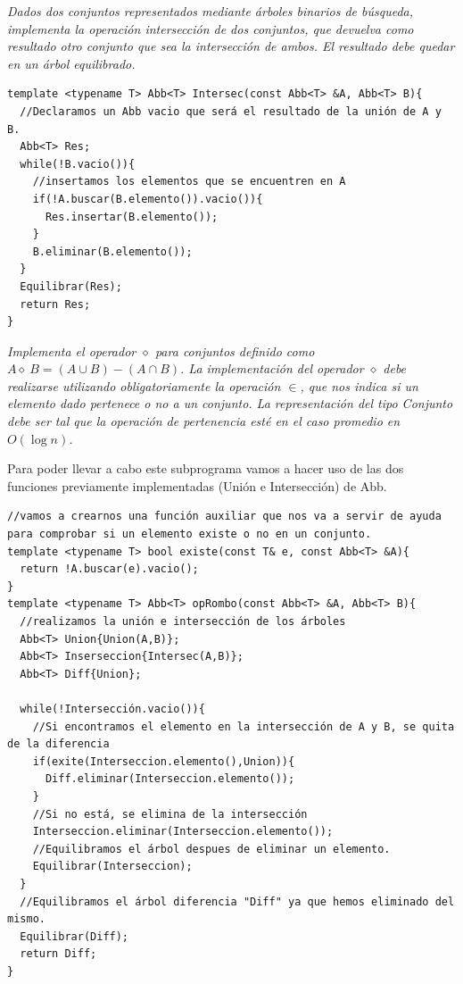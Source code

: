 \textbf{\large{}}\textit{ Dados dos conjuntos representados mediante árboles binarios de búsqueda, implementa la operación intersección de dos conjuntos, que devuelva como resultado otro conjunto que sea la intersección de ambos. El resultado debe quedar en un árbol equilibrado.}
\begin{verbatim}
template <typename T> Abb<T> Intersec(const Abb<T> &A, Abb<T> B){
  //Declaramos un Abb vacio que será el resultado de la unión de A y B.
  Abb<T> Res;
  while(!B.vacio()){
    //insertamos los elementos que se encuentren en A
    if(!A.buscar(B.elemento()).vacio()){
      Res.insertar(B.elemento());
    }
    B.eliminar(B.elemento());
  }
  Equilibrar(Res);
  return Res;
}
\end{verbatim}

\textbf{\large{}}\textit{ Implementa el operador $\diamond$ para conjuntos definido como $A \diamond\ B = (A \cup B) - (A \cap B)$. La implementación del operador $\diamond$ debe realizarse utilizando obligatoriamente la operación $\in$, que nos indica si un elemento dado pertenece o no a un conjunto. La representación del tipo Conjunto debe ser tal que la operación de pertenencia esté en el caso promedio en $O(\log n)$.}

Para poder llevar a cabo este subprograma vamos a hacer uso de las dos funciones previamente implementadas (Unión e Intersección) de Abb.
\begin{verbatim}
//vamos a crearnos una función auxiliar que nos va a servir de ayuda para comprobar si un elemento existe o no en un conjunto.
template <typename T> bool existe(const T& e, const Abb<T> &A){
  return !A.buscar(e).vacio();
}
template <typename T> Abb<T> opRombo(const Abb<T> &A, Abb<T> B){
  //realizamos la unión e intersección de los árboles
  Abb<T> Union{Union(A,B)};
  Abb<T> Inserseccion{Intersec(A,B)};
  Abb<T> Diff{Union};

  while(!Intersección.vacio()){
    //Si encontramos el elemento en la intersección de A y B, se quita de la diferencia
    if(exite(Interseccion.elemento(),Union)){
      Diff.eliminar(Interseccion.elemento());
    }
    //Si no está, se elimina de la intersección
    Interseccion.eliminar(Interseccion.elemento());
    //Equilibramos el árbol despues de eliminar un elemento.
    Equilibrar(Interseccion);
  }
  //Equilibramos el árbol diferencia "Diff" ya que hemos eliminado del mismo.
  Equilibrar(Diff);
  return Diff;
}
\end{verbatim}